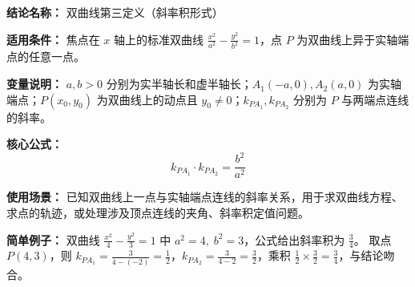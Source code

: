 \textbf{结论名称：} 双曲线第三定义（斜率积形式）

\textbf{适用条件：} 焦点在 $x$ 轴上的标准双曲线 $\frac{x^{2}}{a^{2}}-\frac{y^{2}}{b^{2}}=1$，点 $P$ 为双曲线上异于实轴端点的任意一点。

\textbf{变量说明：} $a,b>0$ 分别为实半轴长和虚半轴长；$A_{1}(-a,0),A_{2}(a,0)$ 为实轴端点；$P(x_{0},y_{0})$ 为双曲线上的动点且 $y_{0}\neq 0$；$k_{PA_{1}},k_{PA_{2}}$ 分别为 $P$ 与两端点连线的斜率。

\textbf{核心公式：}
\[
\boxed{k_{PA_{1}}\cdot k_{PA_{2}}=\frac{b^{2}}{a^{2}}}
\]

\textbf{使用场景：} 已知双曲线上一点与实轴端点连线的斜率关系，用于求双曲线方程、求点的轨迹，或处理涉及顶点连线的夹角、斜率积定值问题。

\textbf{简单例子：}
双曲线 $\frac{x^{2}}{4}-\frac{y^{2}}{3}=1$ 中 $a^{2}=4,\;b^{2}=3$，公式给出斜率积为 $\frac{3}{4}$。
取点 $P(4,3)$，则 $k_{PA_{1}}=\frac{3}{4-(-2)}=\frac{1}{2}$，$k_{PA_{2}}=\frac{3}{4-2}=\frac{3}{2}$，乘积 $\frac{1}{2}\times\frac{3}{2}=\frac{3}{4}$，与结论吻合。